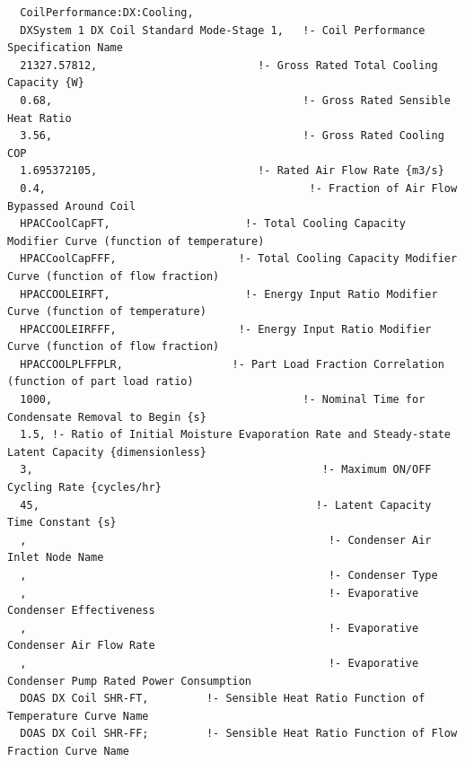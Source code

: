 \begin{lstlisting}
  CoilPerformance:DX:Cooling,
  DXSystem 1 DX Coil Standard Mode-Stage 1,   !- Coil Performance Specification Name
  21327.57812,                         !- Gross Rated Total Cooling Capacity {W}
  0.68,                                       !- Gross Rated Sensible Heat Ratio
  3.56,                                       !- Gross Rated Cooling COP
  1.695372105,                         !- Rated Air Flow Rate {m3/s}
  0.4,                                         !- Fraction of Air Flow Bypassed Around Coil
  HPACCoolCapFT,                     !- Total Cooling Capacity Modifier Curve (function of temperature)
  HPACCoolCapFFF,                   !- Total Cooling Capacity Modifier Curve (function of flow fraction)
  HPACCOOLEIRFT,                     !- Energy Input Ratio Modifier Curve (function of temperature)
  HPACCOOLEIRFFF,                   !- Energy Input Ratio Modifier Curve (function of flow fraction)
  HPACCOOLPLFFPLR,                 !- Part Load Fraction Correlation (function of part load ratio)
  1000,                                       !- Nominal Time for Condensate Removal to Begin {s}
  1.5, !- Ratio of Initial Moisture Evaporation Rate and Steady-state Latent Capacity {dimensionless}
  3,                                             !- Maximum ON/OFF Cycling Rate {cycles/hr}
  45,                                           !- Latent Capacity Time Constant {s}
  ,                                               !- Condenser Air Inlet Node Name
  ,                                               !- Condenser Type
  ,                                               !- Evaporative Condenser Effectiveness
  ,                                               !- Evaporative Condenser Air Flow Rate
  ,                                               !- Evaporative Condenser Pump Rated Power Consumption
  DOAS DX Coil SHR-FT,         !- Sensible Heat Ratio Function of Temperature Curve Name
  DOAS DX Coil SHR-FF;         !- Sensible Heat Ratio Function of Flow Fraction Curve Name



\end{lstlisting}
